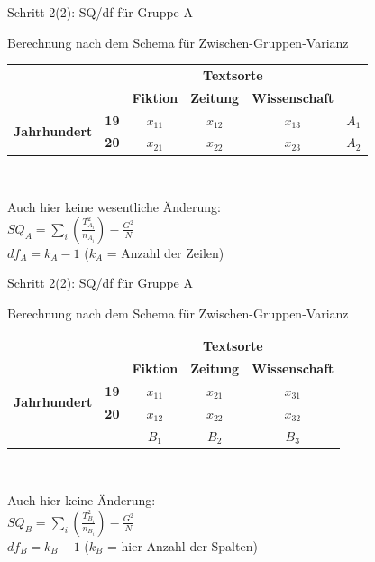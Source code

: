\begin{frame}
  {Schritt 2(2): SQ\slash df für Gruppe A}

  Berechnung nach dem Schema für Zwischen-Gruppen-Varianz

  \begin{center}
    \begin{tabular}[h!]{|cc|ccc||c|}
      \cline{3-5}
      \multicolumn{2}{c|}{} & \multicolumn{3}{c||}{\textbf{Textsorte}} & \multicolumn{1}{c}{}\\
      \multicolumn{2}{c|}{} & \textbf{Fiktion} & \textbf{Zeitung} & \textbf{Wissenschaft} & \multicolumn{1}{c}{}\\
      \hline
      \multirow{2}{*}{\textbf{Jahrhundert}} & \textbf{19} & $x_{11}$ & $x_{12}$ & $x_{13}$ & \alert{$A_1$}\\
      & \textbf{20} & $x_{21}$ & $x_{22}$ & $x_{23}$ & \alert{$A_2$}\\
      \hline
    \end{tabular}\\
    \vspace{0.5cm}

    Auch hier keine wesentliche Änderung:\\
    \alert{$SQ_{A}=\sum\limits_i(\frac{T_{A_i}^2}{n_{A_i}})-\frac{G^2}{N}$}\\
    \alert{$df_{A}=k_A-1$} ($k_A$ = Anzahl der \alert{Zeilen})
  \end{center}
\end{frame}

\begin{frame}
  {Schritt 2(2): SQ\slash df für Gruppe A}

  Berechnung nach dem Schema für Zwischen-Gruppen-Varianz

  \begin{center}
    \begin{tabular}[h!]{|cc|ccc|}
      \cline{3-5}
      \multicolumn{2}{c|}{} & \multicolumn{3}{c|}{\textbf{Textsorte}} \\
      \multicolumn{2}{c|}{} & \textbf{Fiktion} & \textbf{Zeitung} & \textbf{Wissenschaft} \\
      \hline
      \multirow{2}{*}{\textbf{Jahrhundert}} & \textbf{19} & $x_{11}$ & $x_{21}$ & $x_{31}$ \\
      & \textbf{20} & $x_{12}$ & $x_{22}$ & $x_{32}$ \\
      \hline\hline
      \multicolumn{2}{c|}{} & \alert{$B_1$} & \alert{$B_2$} & \alert{$B_3$} \\
      \cline{3-5}
    \end{tabular}\\
    \vspace{0.5cm}

    Auch hier keine Änderung:\\
    \alert{$SQ_{B}=\sum\limits_i(\frac{T_{B_i}^2}{n_{B_i}})-\frac{G^2}{N}$}\\
    \alert{$df_{B}=k_B-1$} ($k_B$ = hier Anzahl der \alert{Spalten})
  \end{center}
\end{frame}

